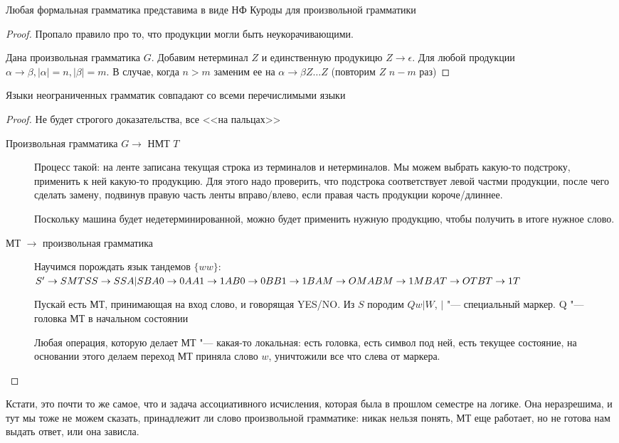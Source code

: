\begin{theorem}
Любая формальная грамматика представима в виде НФ Куроды для произвольной грамматики
\end{theorem}
\begin{proof}
Пропало правило про то, что продукции могли быть неукорачивающими.

Дана произвольная грамматика $G$. Добавим нетерминал $Z$ и единственную продукицю $Z \to \epsilon$.
Для любой продукции $\alpha \to \beta, |\alpha| = n, |\beta| = m$. В случае, когда $n > m$ заменим ее на $\alpha \to \beta Z \dots Z$ (повторим $Z$ $n - m$ раз)
\end{proof}

\begin{theorem}
Языки неограниченных грамматик совпадают со всеми перечислимыми языки
\end{theorem}
\begin{proof}
Не будет строгого доказательства, все <<на пальцах>>
\begin{description}
\item[Произвольная грамматика $G \to$ НМТ $T$]
Процесс такой: на ленте записана текущая строка из терминалов и нетерминалов. Мы можем выбрать какую-то подстроку, применить к ней какую-то продукцию.
Для этого надо проверить, что подстрока соответствует левой частми продукции, после чего сделать замену, подвинув правую часть ленты вправо/влево, если правая часть продукции короче/длиннее.

Поскольку машина будет недетерминированной, можно будет применить нужную продукцию, чтобы получить в итоге нужное слово.

\item[МТ $\to$ произвольная грамматика]
Научимся порождать язык тандемов $\{ww\}$: $\\
S' \to SMT\\
SS \to SSA | SB \\ 
A0 \to 0A \\
A1 \to 1A \\
B0 \to 0B \\
B1 \to 1B \\
AM \to OMA \\
BM \to 1MB \\ 
AT \to OT \\
BT \to 1T$

Пускай есть МТ, принимающая на вход слово, и говорящая YES/NO. 
Из $S$ породим $Qw|W$, $|$ "--- специальный маркер. Q "--- головка МТ в начальном состоянии

Любая операция, которую делает МТ "--- какая-то локальная: есть головка, есть символ под ней, есть текущее состояние, на основании этого делаем переход
МТ приняла слово $w$, уничтожили все что слева от маркера.
\end{description}
\end{proof}
\begin{Rem}
Кстати, это почти то же самое, что и задача ассоциативного исчисления, которая была в прошлом семестре на логике. 
Она неразрешима, и тут мы тоже не можем сказать, принадлежит ли слово произвольной грамматике: никак нельзя понять, МТ еще работает, но не готова нам выдать ответ, или она зависла. 
\end{Rem}
